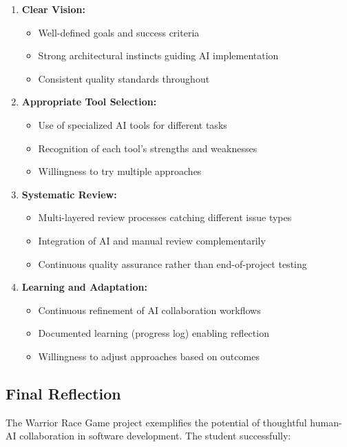 \documentclass[12pt,a4paper]{article}
\begin{document}
\begin{enumerate}
    \item \textbf{Clear Vision:}
    \begin{itemize}
        \item Well-defined goals and success criteria
        \item Strong architectural instincts guiding AI implementation
        \item Consistent quality standards throughout
    \end{itemize}
    
    \item \textbf{Appropriate Tool Selection:}
    \begin{itemize}
        \item Use of specialized AI tools for different tasks
        \item Recognition of each tool's strengths and weaknesses
        \item Willingness to try multiple approaches
    \end{itemize}
    
    \item \textbf{Systematic Review:}
    \begin{itemize}
        \item Multi-layered review processes catching different issue types
        \item Integration of AI and manual review complementarily
        \item Continuous quality assurance rather than end-of-project testing
    \end{itemize}
    
    \item \textbf{Learning and Adaptation:}
    \begin{itemize}
        \item Continuous refinement of AI collaboration workflows
        \item Documented learning (progress log) enabling reflection
        \item Willingness to adjust approaches based on outcomes
    \end{itemize}
\end{enumerate}

\subsection{Final Reflection}

The Warrior Race Game project exemplifies the potential of thoughtful human-AI collaboration in software development. The student successfully:
\end{document}
